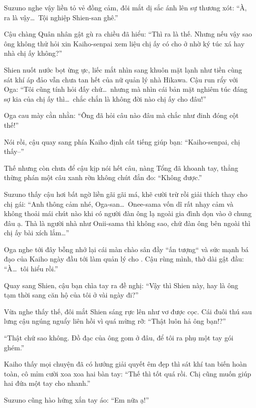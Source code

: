 \documentclass[../main.tex]{subfiles}
\begin{document}

Suzuno nghe vậy liền tỏ vẻ đồng cảm, đôi mắt dị sắc ánh lên sự thương xót: ``À, ra là vậy\dots\ Tội nghiệp Shien-san ghê.''

Cậu chàng Quân nhân gật gù ra chiều đã hiểu: ``Thì ra là thế. Nhưng nếu vậy sao ông không thử hỏi xin Kaiho-senpai xem liệu chị ấy có cho ở nhờ ký túc xá hay nhà chị ấy không?''

Shien nuốt nước bọt ừng ực, liếc mắt nhìn sang khuôn mặt lạnh như tiền cùng sát khí áp đảo vẫn chưa tan hết của nữ quản lý nhà Hikawa. Cậu run rẩy với Oga: ``Tôi cũng tính hỏi đấy chứ\dots\ nhưng mà nhìn cái bản mặt nghiêm túc đáng sợ kia của chị ấy thì\dots\ chắc chắn là không đời nào chị ấy cho đâu!''

Oga cau mày cằn nhằn: ``Ông đã hỏi câu nào đâu mà chắc như đinh đóng cột thế!''

Nói rồi, cậu quay sang phía Kaiho định cất tiếng giúp bạn: ``Kaiho-senpai, chị thấy--''

Thế nhưng còn chưa để cậu kịp nói hết câu, nàng Tổng đã khoanh tay, thẳng thừng phán một câu xanh rờn không chút đắn đo: ``Không được.''

Suzuno thấy cậu hơi bất ngờ liền gãi gãi má, khẽ cười trừ rồi giải thích thay cho chị gái: ``Anh thông cảm nhé, Oga-san\dots\ Onee-sama vốn dĩ rất nhạy cảm và không thoải mái chút nào khi có người đàn ông lạ ngoài gia đình dọn vào ở chung đâu ạ. Thà là người nhà như Onii-sama thì không sao, chứ đàn ông bên ngoài thì chị ấy bài xích lắm\dots''

Oga nghe tới đây bỗng nhớ lại cái màn chào sân đầy ``ấn tượng`` và sức mạnh bá đạo của Kaiho ngày đầu tới làm quản lý cho \hls. Cậu rùng mình, thở dài gật đầu: ``À\dots\ tôi hiểu rồi.''

Quay sang Shien, cậu bạn chìa tay ra đề nghị: ``Vậy thì Shien này, hay là ông tạm thời sang căn hộ của tôi ở vài ngày đi?''

Vừa nghe thấy thế, đôi mắt Shien sáng rực lên như vơ được cọc. Cái đuôi thú sau lưng cậu ngúng nguẩy liên hồi vì quá mừng rỡ: ``Thật luôn hả ông bạn!?''


``Thật chứ sao không. Đồ đạc của ông gom ở đâu, để tôi ra phụ một tay gói ghém.''

Kaiho thấy mọi chuyện đã có hướng giải quyết êm đẹp thì sát khí tan biến hoàn toàn, cô mỉm cười xoa xoa hai bàn tay: ``Thế thì tốt quá rồi. Chị cũng muốn giúp hai đứa một tay cho nhanh.''

Suzuno cũng hào hứng xắn tay áo: ``Em nữa ạ!''
\end{document}
